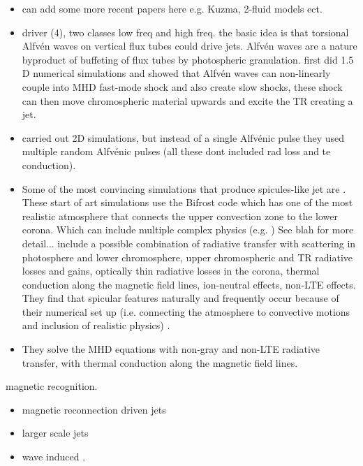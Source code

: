 \documentclass[12pt]{ociamthesis}
\newcommand{\Alfven}{Alfv\'{e}n }
\newcommand{\Alfvenic}{Alfv\'{e}nic }
\begin{document}
\begin{itemize}
\item can add some more recent papers here e.g. Kuzma, 2-fluid models ect.
\item driver (4), two classes low freq and high freq. the basic idea is that torsional \Alfven waves on vertical flux tubes could drive jets. \Alfven waves are a nature byproduct of buffeting of flux tubes by photospheric granulation. \cite{Hollweg1982SoPh7535H,Hollweg1992ApJ389731H} first did 1.5 D numerical simulations and showed that \Alfven waves can non-linearly couple into MHD fast-mode shock and also create slow shocks, these shock can then move chromospheric material upwards and excite the TR creating a jet. 
\item \cite{Kudoh1999ApJ514493K} carried out 2D simulations, but instead of a single \Alfvenic pulse they used multiple random \Alfvenic pulses (all these dont included rad loss and te conduction).  
\item Some of the most convincing simulations that produce spicules-like jet are \citep{Mart2017Sci3561269M,Mart2018ApJ860116M,Mart2020ApJ88995M}. These start of art simulations use the Bifrost code \citep{Gudiksen2011AA531A154G} which has one of the most realistic atmosphere that connects the upper convection zone to the lower corona. Which can include multiple complex physics (e.g. ) See blah for more detail... include a possible combination of radiative transfer with scattering in photosphere and lower chromosphere, upper chromospheric and TR radiative losses and gains, optically thin radiative losses in the corona, thermal conduction along the magnetic field lines, ion-neutral effects, non-LTE effects. They find that spicular features naturally and frequently occur because of their numerical set up (i.e. connecting the atmosphere to convective motions and inclusion of realistic physics) \cite{Mart2017Sci3561269M}. 
\item They solve the MHD equations with non-gray and non-LTE radiative transfer, with thermal conduction along the magnetic field lines. 
\end{itemize}
magnetic recognition.
\begin{itemize}
\item magnetic reconnection driven jets \cite{Gonz2018arXiv180704224G,Gonz2018ApJ856176G,Gonz2017ApJ,Isobe2008ApJ679L57I,Archontis2005ApJ6351299A} 
\item larger scale jets \cite{Yokoyama1995Natur37542Y,Yokoyama1996PASJ48353Y,Nishizuka2008ApJ683L83N}
\item wave induced \cite{Heggland2009ApJ7021H}.
\end{itemize}
\end{document}
